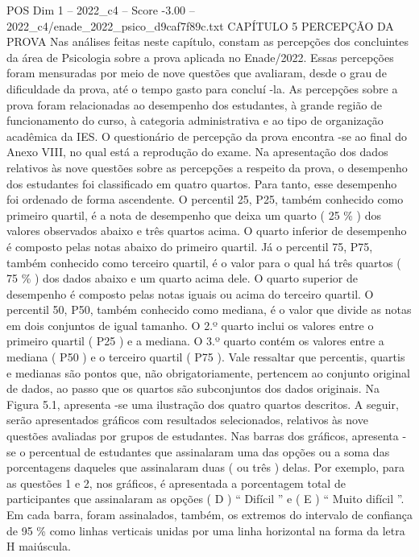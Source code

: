 \begin{textsample}{POS Dim 1 – 2022\_c4 – Score -3.00 – 2022\_c4/enade\_2022\_psico\_d9caf7f89c.txt}  \label{ex:f1_pos_259}
CAPÍTULO 5 PERCEPÇÃO DA PROVA Nas análises feitas neste capítulo, constam as percepções dos concluintes da área de Psicologia sobre a prova aplicada no Enade/2022.
Essas percepções foram mensuradas por meio de nove questões que avaliaram, desde o grau de dificuldade da prova, até o tempo gasto para concluí -la.
As percepções sobre a prova foram relacionadas ao desempenho dos estudantes, à grande região de funcionamento do curso, à categoria administrativa e ao tipo de organização acadêmica da IES.
O questionário de percepção da prova encontra -se ao final do Anexo VIII, no qual está a reprodução do exame.
Na apresentação dos dados relativos às nove questões sobre as percepções a respeito da prova, o desempenho dos estudantes foi classificado em quatro quartos.
Para tanto, esse desempenho foi ordenado de forma ascendente.
O percentil 25, P25, também conhecido como primeiro quartil, é a nota de desempenho que deixa um quarto ( 25 \% ) dos valores observados abaixo e três quartos acima.
O quarto inferior de desempenho é composto pelas notas abaixo do primeiro quartil.
Já o percentil 75, P75, também conhecido como terceiro quartil, é o valor para o qual há três quartos ( 75 \% ) dos dados abaixo e um quarto acima dele.
O quarto superior de desempenho é composto pelas notas iguais ou acima do terceiro quartil.
O percentil 50, P50, também conhecido como mediana, é o valor que divide as notas em dois conjuntos de igual tamanho.
O 2.º quarto inclui os valores entre o primeiro quartil ( P25 ) e a mediana.
O 3.º quarto contém os valores entre a mediana ( P50 ) e o terceiro quartil ( P75 ).
Vale ressaltar que percentis, quartis e medianas são pontos que, não obrigatoriamente, pertencem ao conjunto original de dados, ao passo que os quartos são subconjuntos dos dados originais.
Na Figura 5.1, apresenta -se uma ilustração dos quatro quartos descritos.
A seguir, serão apresentados gráficos com resultados selecionados, relativos às nove questões avaliadas por grupos de estudantes.
Nas barras dos gráficos, apresenta -se o percentual de estudantes que assinalaram uma das opções ou a soma das porcentagens daqueles que assinalaram duas ( ou três ) delas.
Por exemplo, para as questões 1 e 2, nos gráficos, é apresentada a porcentagem total de participantes que assinalaram as opções ( D ) “ Difícil ” e ( E ) “ Muito difícil ”.
Em cada barra, foram assinalados, também, os extremos do intervalo de confiança de 95 \% como linhas verticais unidas por uma linha horizontal na forma da letra H maiúscula.

\end{textsample}
